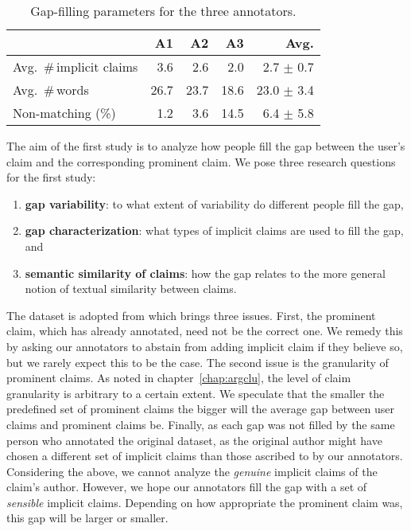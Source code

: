 \begin{table}[t]
{\small
\begin{center}
\begin{tabular}{lrrrr}
\toprule
& A1 & A2 & A3 & Avg.\\
\midrule
Avg.~\#\,implicit claims  & 3.6  & 2.6   & 2.0   &  \phantom{0}2.7 $\pm$ 0.7  \\
Avg.~\#\,words     & 26.7 & 23.7  & 18.6  &  23.0 $\pm$ 3.4      \\
Non-matching (\%)     & 1.2  & 3.6   & 14.5  &  \phantom{0}6.4 $\pm$ 5.8  \\
\bottomrule
\end{tabular}
\caption{Gap-filling parameters for the three annotators.}
\label{tab:var-annotators}
\end{center}}
\end{table}

The aim of the first study is to analyze how people fill 
the gap between the user's claim and the corresponding prominent claim. 
We pose three research questions for the first study: 
\begin{enumerate}[label=\arabic*)]
\item \textbf{gap variability}: to what extent of variability do different people fill the gap,
\item \textbf{gap characterization}: what types of implicit claims are used to fill the gap, and
\item \textbf{semantic similarity of claims}: how the gap relates to the more general notion of 
textual similarity between claims. 
\end{enumerate}
The dataset is adopted from \citet{hasan2014you} which brings three issues. 
First, the prominent claim, which has already annotated, need not be
the correct one. 
We remedy this by asking our annotators to abstain from adding implicit claim if 
they believe so, but we rarely expect this to be the case. 
The second issue is the granularity of prominent claims. 
As noted in chapter~\ref{chap:argclu}, the level of claim granularity is 
arbitrary to a certain extent. 
We speculate that the smaller the predefined set of prominent claims the 
bigger will the average gap between user claims and prominent claims be. 
Finally, as each gap was not filled by the same person who annotated the original 
dataset, as the original author might have chosen a different set of implicit claims than those
ascribed to by our annotators. 
Considering the above, we cannot analyze the \emph{genuine} implicit claims
of the claim's author. 
However, we hope our annotators fill the gap with a set of \emph{sensible} implicit 
claims. 
Depending on how appropriate the prominent claim was, this gap will be larger or smaller. 

